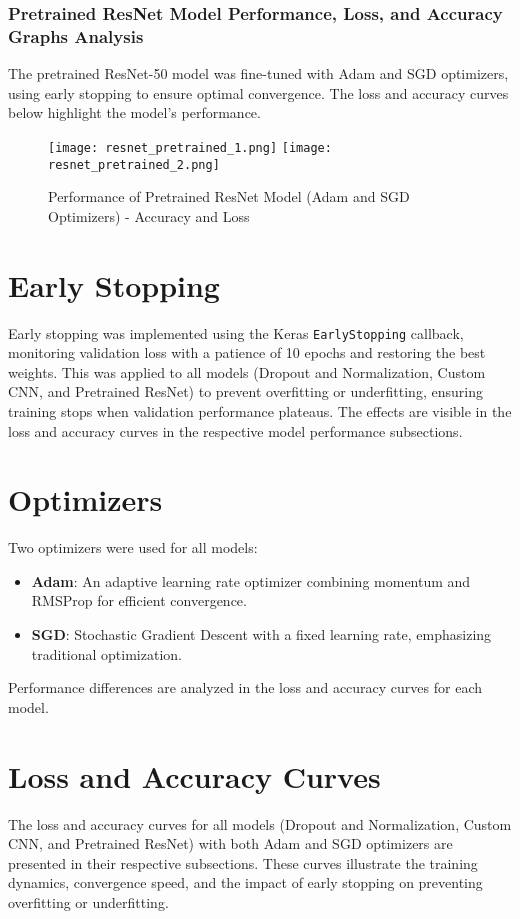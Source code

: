 \documentclass[a4paper,12pt]{article}
\begin{document}
\subsubsection*{Pretrained ResNet Model Performance, Loss, and Accuracy Graphs Analysis}
The pretrained ResNet-50 model was fine-tuned with Adam and SGD optimizers, using early stopping to ensure optimal convergence. The loss and accuracy curves below highlight the model’s performance.

\begin{figure}[h]
    \centering
    \texttt{[image: resnet\_pretrained\_1.png]}
    \texttt{[image: resnet\_pretrained\_2.png]}
    \caption{Performance of Pretrained ResNet Model (Adam and SGD Optimizers) - Accuracy and Loss}
\end{figure}

\section*{Early Stopping}
Early stopping was implemented using the Keras \texttt{EarlyStopping} callback, monitoring validation loss with a patience of 10 epochs and restoring the best weights. This was applied to all models (Dropout and Normalization, Custom CNN, and Pretrained ResNet) to prevent overfitting or underfitting, ensuring training stops when validation performance plateaus. The effects are visible in the loss and accuracy curves in the respective model performance subsections.

\section*{Optimizers}
Two optimizers were used for all models:
\begin{itemize}
    \item \textbf{Adam}: An adaptive learning rate optimizer combining momentum and RMSProp for efficient convergence.
    \item \textbf{SGD}: Stochastic Gradient Descent with a fixed learning rate, emphasizing traditional optimization.
\end{itemize}
Performance differences are analyzed in the loss and accuracy curves for each model.

\section*{Loss and Accuracy Curves}
The loss and accuracy curves for all models (Dropout and Normalization, Custom CNN, and Pretrained ResNet) with both Adam and SGD optimizers are presented in their respective subsections. These curves illustrate the training dynamics, convergence speed, and the impact of early stopping on preventing overfitting or underfitting.
\end{document}
